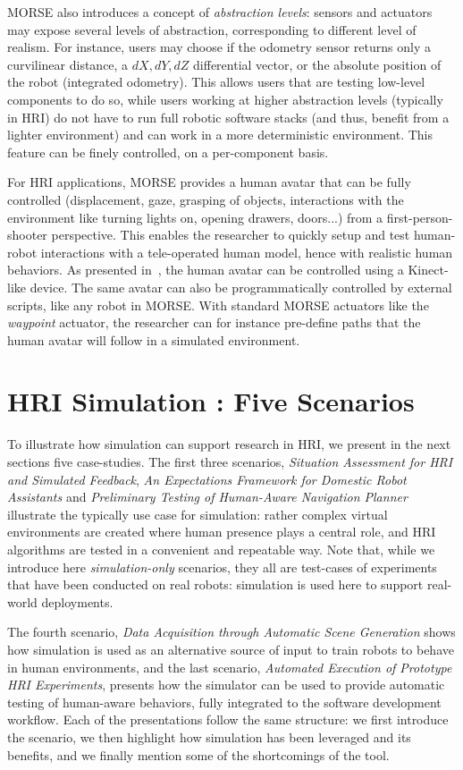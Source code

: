\documentclass{llncs}
\begin{document}
MORSE also introduces a concept of \emph{abstraction levels}: sensors and actuators
may expose several levels of abstraction, corresponding to different level of
realism. For instance, users may choose if the odometry sensor returns only a
curvilinear distance, a $dX, dY, dZ$ differential vector, or the absolute
position of the robot (integrated odometry). This allows users that are testing
low-level components to do so, while users working at higher abstraction
levels (typically in HRI) do not have to run full robotic software stacks (and
thus, benefit from a lighter environment) and can work in a more deterministic
environment. This feature can be finely controlled, on a per-component basis.

For HRI applications, MORSE provides a human avatar that can be fully controlled
(displacement, gaze, grasping of objects, interactions with the environment like
turning lights on, opening drawers, doors...) from a first-person-shooter perspective.
This enables the researcher to quickly setup and test human-robot interactions
with a tele-operated human model, hence with realistic human behaviors. As
presented in~\cite{lemaignan2012morse}, the human avatar can be controlled using
a Kinect-like device. The same avatar can also be programmatically controlled
by external scripts, like any robot in MORSE. With standard MORSE actuators like
the \emph{waypoint} actuator, the researcher can for instance pre-define paths
that the human avatar will follow in a simulated environment.

\section{HRI Simulation : Five Scenarios}

To illustrate how simulation can support research in HRI, we present in the next
sections five case-studies.  The first three scenarios, \emph{Situation
Assessment for HRI and Simulated Feedback}, \emph{An Expectations Framework for
Domestic Robot Assistants} and \emph{Preliminary Testing of Human-Aware
Navigation Planner} illustrate the typically use case for simulation: rather
complex virtual environments are created where human presence plays a
central role, and HRI algorithms are tested in a convenient and repeatable way.
Note that, while we introduce here \emph{simulation-only} scenarios, they all
are test-cases of experiments that have been conducted on real robots:
simulation is used here to support real-world deployments.

The fourth scenario, \emph{Data Acquisition through Automatic Scene Generation}
shows how simulation is used as an alternative source of input to train robots to
behave in human environments, and the last scenario, \emph{Automated Execution
of Prototype HRI Experiments}, presents how the simulator can be used to provide
automatic testing of human-aware behaviors, fully integrated to the software
development workflow. Each of the presentations follow the same structure: we
first introduce the scenario, we then highlight how simulation has been leveraged
and its benefits, and we finally mention some of the shortcomings of the tool.
\end{document}
